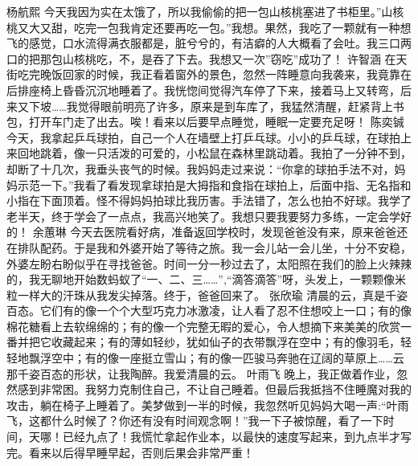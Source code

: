 {}杨航熙\markdownRendererInterblockSeparator
{}今天我因为实在太饿了，所以我偷偷的把一包山核桃塞进了书柜里。”山核桃又大又甜，吃完一包我肯定还要再吃一包。”我想。果然，我吃了一颗就有一种想飞的感觉，口水流得满衣服都是，脏兮兮的，有洁癖的人大概看了会吐。我三口两口的把那包山核桃吃，不，是吞了下去。我想又一次”窃吃”成功了！\markdownRendererInterblockSeparator
{}\markdownRendererInterblockSeparator
{}许智涵\markdownRendererInterblockSeparator
{}在天街吃完晚饭回家的时候，我正看着窗外的景色，忽然一阵睡意向我袭来，我竟靠在后排座椅上昏昏沉沉地睡着了。我恍惚间觉得汽车停了下来，接着马上又转弯，后来又下坡……我觉得眼前明亮了许多，原来是到车库了，我猛然清醒，赶紧背上书包，打开车门走了出去。唉！看来以后要早点睡觉，睡眠一定要充足呀！\markdownRendererInterblockSeparator
{}\markdownRendererInterblockSeparator
{}陈奕铖\markdownRendererInterblockSeparator
{}今天，我拿起乒乓球拍，自己一个人在墙壁上打乒乓球。小小的乒乓球，在球拍上来回地跳着，像一只活泼的可爱的，小松鼠在森林里跳动着。我拍了一分钟不到，却断了十几次，我垂头丧气的时候。我妈妈走过来说：“你拿的球拍手法不对，妈妈示范一下。”我看了看发现拿球拍是大拇指和食指在球拍上，后面中指、无名指和小指在下面顶着。怪不得妈妈拍球比我历害。手法错了，怎么也拍不好球。我学了老半天，终于学会了一点点，我高兴地笑了。我想只要我要努力多练，一定会学好的！\markdownRendererInterblockSeparator
{}\markdownRendererInterblockSeparator
{}余蕙琳\markdownRendererInterblockSeparator
{}今天去医院看好病，准备返回学校时，发现爸爸没有来，原来爸爸还在排队配药。于是我和外婆开始了等待之旅。我一会儿站一会儿坐，十分不安稳，外婆左盼右盼似乎在寻找爸爸。时间一分一秒过去了，太阳照在我们的脸上火辣辣的，我无聊地开始数蚂蚁了“一、二、三……”,“滴答滴答”呀，头发上，一颗颗像米粒一样大的汗珠从我发尖掉落。终于，爸爸回来了。\markdownRendererInterblockSeparator
{}\markdownRendererInterblockSeparator
{}张欣瑜\markdownRendererInterblockSeparator
{}清晨的云，真是千姿百态。它们有的像一个个大型巧克力冰激凌，让人看了忍不住想咬上一口；有的像棉花糖看上去软绵绵的；有的像一个完整无暇的爱心，令人想摘下来美美的欣赏一番并把它收藏起来；有的薄如轻纱，犹如仙子的衣带飘浮在空中；有的像羽毛，轻轻地飘浮空中；有的像一座挺立雪山；有的像一匹骏马奔驰在辽阔的草原上……云那千姿百态的形状，让我陶醉。我爱清晨的云。\markdownRendererInterblockSeparator
{}\markdownRendererInterblockSeparator
{}叶雨飞\markdownRendererInterblockSeparator
{}晚上，我正做着作业，忽然感到非常困。我努力克制住自己，不让自己睡着。但最后我抵挡不住睡魔对我的攻击，躺在椅子上睡着了。美梦做到一半的时候，我忽然听见妈妈大喝一声:“叶雨飞，这都什么时候了？你还有没有时间观念啊！”我一下子被惊醒，看了一下时间，天哪！已经九点了！我慌忙拿起作业本，以最快的速度写起来，到九点半才写完。看来以后得早睡早起，否则后果会非常严重！\markdownRendererInterblockSeparator
